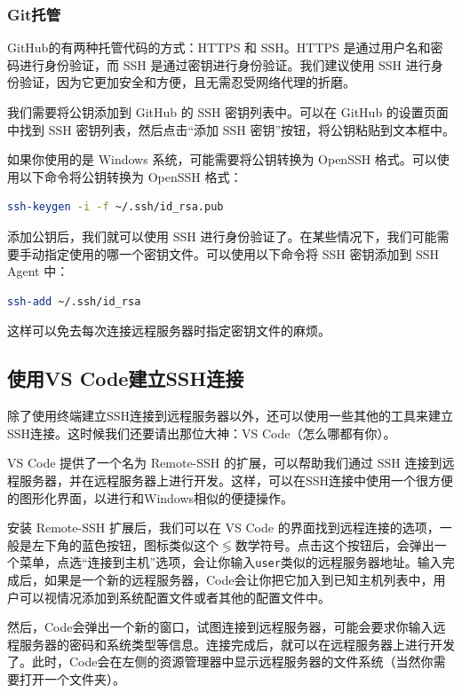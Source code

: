 \documentclass[../main.tex]{subfiles}
\begin{document}
\subsubsection{Git托管}

GitHub的有两种托管代码的方式：HTTPS 和 SSH。HTTPS 是通过用户名和密码进行身份验证，而 SSH 是通过密钥进行身份验证。我们建议使用 SSH 进行身份验证，因为它更加安全和方便，且无需忍受网络代理的折磨。

我们需要将公钥添加到 GitHub 的 SSH 密钥列表中。可以在 GitHub 的设置页面中找到 SSH 密钥列表，然后点击“添加 SSH 密钥”按钮，将公钥粘贴到文本框中。

如果你使用的是 Windows 系统，可能需要将公钥转换为 OpenSSH 格式。可以使用以下命令将公钥转换为 OpenSSH 格式：
\begin{lstlisting}[language=bash]
ssh-keygen -i -f ~/.ssh/id_rsa.pub
\end{lstlisting}

添加公钥后，我们就可以使用 SSH 进行身份验证了。在某些情况下，我们可能需要手动指定使用的哪一个密钥文件。可以使用以下命令将 SSH 密钥添加到 SSH Agent 中：
\begin{lstlisting}[language=bash]
ssh-add ~/.ssh/id_rsa
\end{lstlisting}

这样可以免去每次连接远程服务器时指定密钥文件的麻烦。

\subsection{使用VS Code建立SSH连接}

除了使用终端建立SSH连接到远程服务器以外，还可以使用一些其他的工具来建立SSH连接。这时候我们还要请出那位大神：VS Code（怎么哪都有你）。

VS Code 提供了一个名为 Remote-SSH 的扩展，可以帮助我们通过 SSH 连接到远程服务器，并在远程服务器上进行开发。这样，可以在SSH连接中使用一个很方便的图形化界面，以进行和Windows相似的便捷操作。

安装 Remote-SSH 扩展后，我们可以在 VS Code 的界面找到远程连接的选项，一般是左下角的蓝色按钮，图标类似这个$\lessgtr$数学符号。点击这个按钮后，会弹出一个菜单，点选“连接到主机”选项，会让你输入\texttt{user\@host}类似的远程服务器地址。输入完成后，如果是一个新的远程服务器，Code会让你把它加入到已知主机列表中，用户可以视情况添加到系统配置文件或者其他的配置文件中。

然后，Code会弹出一个新的窗口，试图连接到远程服务器，可能会要求你输入远程服务器的密码和系统类型等信息。连接完成后，就可以在远程服务器上进行开发了。此时，Code会在左侧的资源管理器中显示远程服务器的文件系统（当然你需要打开一个文件夹）。
\end{document}
